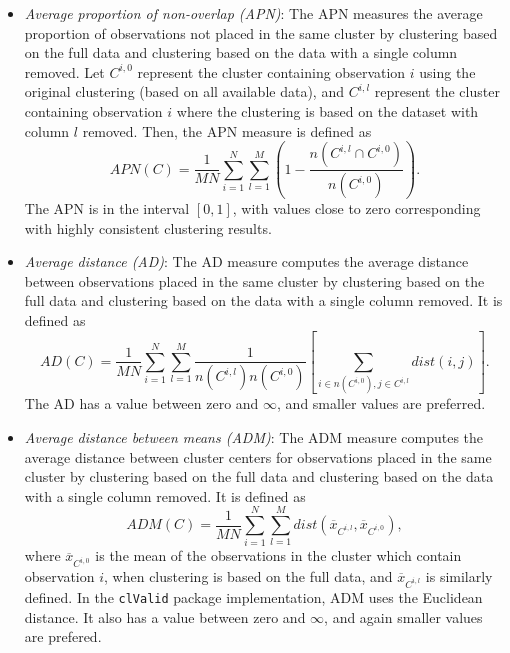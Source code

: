 \documentclass[10pt]{article}\usepackage[]{graphicx}\usepackage[]{color}
\begin{document}
\begin{itemize}
\item \textit{Average proportion of non-overlap (APN)}:
\newline \newline
The APN measures the average proportion of observations not placed in the same cluster
by clustering based on the full data and clustering based on the data with a single column
removed. Let $C^{i,0}$ represent the cluster containing observation $i$ using the original clustering
(based on all available data), and $C^{i,l}$ represent the cluster containing observation $i$ where
the clustering is based on the dataset with column $l$ removed. Then, the APN measure is
defined as
$$APN(C)=\frac{1}{MN}\sum_{i=1}^{N}\sum_{l=1}^{M}\left ( 1-\frac{n(C^{i,l}\cap C^{i,0})}{n(C^{i,0})} \right ).$$
The APN is in the interval $[0, 1]$, with values close to zero corresponding with highly consistent
clustering results.

\item \textit{Average distance (AD)}:
\newline \newline
The AD measure computes the average distance between observations placed in the same
cluster by clustering based on the full data and clustering based on the data with a single
column removed. It is defined as
$$AD(C)=\frac{1}{MN}\sum_{i=1}^{N}\sum_{l=1}^{M}\frac{1}{n(C^{i,l})n(C^{i,0})}\left [ \sum_{i \in n(C^{i,0}), j \in C^{i,l} } dist(i,j) \right ].$$
The AD has a value between zero and $\infty$, and smaller values are preferred.

\item \textit{Average distance between means (ADM)}:
\newline \newline
The ADM measure computes the average distance between cluster centers for observations
placed in the same cluster by clustering based on the full data and clustering based on the
data with a single column removed. It is defined as
$$ADM(C)=\frac{1}{MN}\sum_{i=1}^{N}\sum_{l=1}^{M}dist(\overline{x}_{C^{i,l}}, \overline{x}_{C^{i,0}})
,$$
where $\overline{x}_{C^{i,0}}$ is the mean of the observations in the cluster which contain observation $i$, when clustering is based on the full data, and $\overline{x}_{C^{i,l}}$ is similarly defined.
\newline \newline
In the \texttt{clValid} package implementation, ADM uses the Euclidean distance. 
It also has a value between zero and $\infty$, and again smaller values are
prefered.


\end{itemize}
\end{document}

